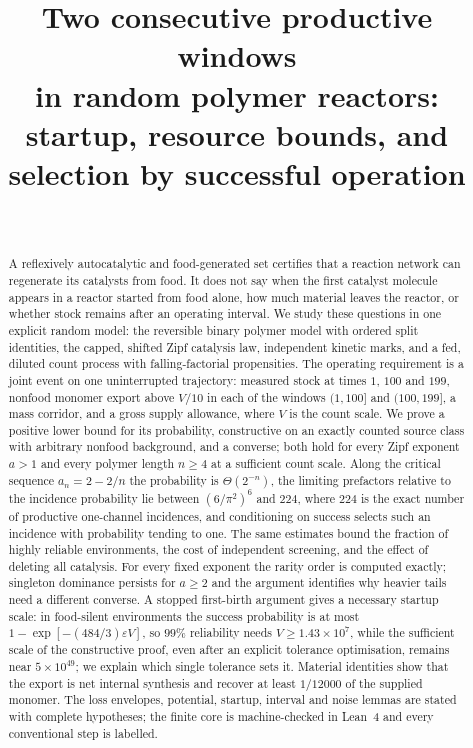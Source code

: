 \documentclass[11pt,letterpaper]{article}
\title{Two consecutive productive windows\\ in random polymer reactors:\\[4pt]
\large startup, resource bounds, and selection by successful operation}
\author{\PaperAuthor\\[2pt]\small\PaperAffiliation}
\date{\PaperDate}
\theoremstyle{plain}
\theoremstyle{definition}
\theoremstyle{remark}
\numberwithin{equation}{section}
\newcommand{\eps}{\varepsilon}
\begin{document}
\maketitle

\begin{abstract}
A reflexively autocatalytic and food-generated set certifies that a reaction network can regenerate its catalysts from food. It does not say when the first catalyst molecule appears in a reactor started from food alone, how much material leaves the reactor, or whether stock remains after an operating interval. We study these questions in one explicit random model: the reversible binary polymer model with ordered split identities, the capped, shifted Zipf catalysis law, independent kinetic marks, and a fed, diluted count process with falling-factorial propensities. The operating requirement is a joint event on one uninterrupted trajectory: measured stock at times $1$, $100$ and $199$, nonfood monomer export above $V/10$ in each of the windows $(1,100]$ and $(100,199]$, a mass corridor, and a gross supply allowance, where $V$ is the count scale. We prove a positive lower bound for its probability, constructive on an exactly counted source class with arbitrary nonfood background, and a converse; both hold for every Zipf exponent $a>1$ and every polymer length $n\ge4$ at a sufficient count scale. Along the critical sequence $a_n=2-2/n$ the probability is $\Theta(2^{-n})$, the limiting prefactors relative to the incidence probability lie between $(6/\pi^2)^6$ and $224$, where $224$ is the exact number of productive one-channel incidences, and conditioning on success selects such an incidence with probability tending to one. The same estimates bound the fraction of highly reliable environments, the cost of independent screening, and the effect of deleting all catalysis. For every fixed exponent the rarity order is computed exactly; singleton dominance persists for $a\ge2$ and the argument identifies why heavier tails need a different converse. A stopped first-birth argument gives a necessary startup scale: in food-silent environments the success probability is at most $1-\exp[-(484/3)\eps V]$, so $99\%$ reliability needs $V\ge1.43\times10^7$, while the sufficient scale of the constructive proof, even after an explicit tolerance optimisation, remains near $5\times10^{49}$; we explain which single tolerance sets it. Material identities show that the export is net internal synthesis and recover at least $1/12000$ of the supplied monomer. The loss envelopes, potential, startup, interval and noise lemmas are stated with complete hypotheses; the finite core is machine-checked in Lean~4 and every conventional step is labelled.
\end{abstract}
\end{document}
